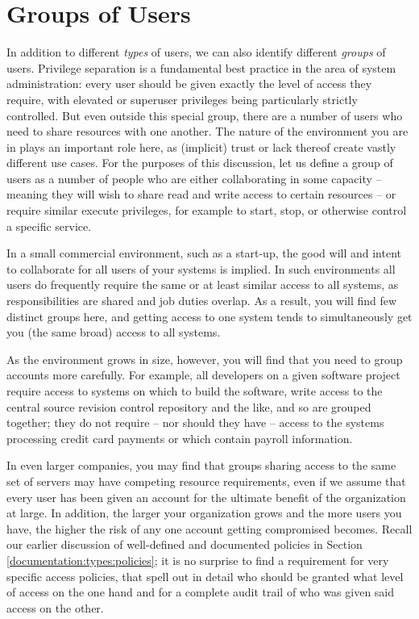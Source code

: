 \section{Groups of Users}
\label{multi-user:groups}

In addition to different {\em types} of users, we can
also identify different {\em groups} of users.
Privilege separation is a fundamental best practice in
the area of system administration: every user should
be given exactly the level of access they require,
with elevated or superuser privileges being
particularly strictly controlled.  But even outside
this special group, there are a number of users who
need to share resources with one another.  The nature
of the environment you are in plays an important role
here, as (implicit) trust or lack thereof create
vastly different use cases.  For the purposes of this
discussion, let us define a group of users as a number
of people who are either collaborating in some
capacity -- meaning they will wish to share read and
write access to certain resources -- or require
similar execute privileges, for example to start,
stop, or otherwise control a specific service.

In a small commercial environment, such as a start-up,
the good will and intent to collaborate for all users
of your systems is implied.  In such environments all
users do frequently require the same or at least
similar access to all systems, as responsibilities are
shared and job duties overlap.  As a result, you will
find few distinct groups here, and getting access to
one system tends to simultaneously get you (the same
broad) access to all systems.

As the environment grows in size, however, you will
find that you need to group accounts more carefully.
For example, all developers on a given software
project require access to systems on which to build
the software, write access to the central source
revision control repository
and the like, and so are grouped together; they do not
require -- nor should they have -- access to the
systems processing credit card payments or which
contain payroll information.

In even larger companies, you may find that groups
sharing access to the same set of servers may have
competing resource requirements, even if we assume
that every user has been given an account for the
ultimate benefit of the organization at large. In
addition, the larger your organization grows and the
more users you have, the higher the risk of any one
account getting compromised becomes.  Recall our
earlier discussion of well-defined and documented
policies in Section
\ref{documentation:types:policies}; it is no surprise
to find a requirement for very specific access
policies, that spell out in detail who should be
granted what level of access on the one hand and for a
complete audit trail of who was given said access on
the other. \\

